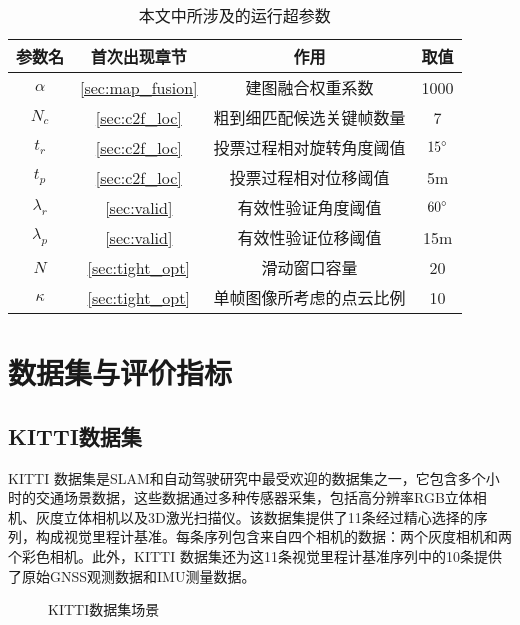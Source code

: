 \begin{table}
\centering
\caption{本文中所涉及的运行超参数}
\begin{tabular}{cccc}
\toprule
参数名 & 首次出现章节 & 作用 & 取值 \\
\midrule
$\alpha$ &  \ref{sec:map_fusion}  & 建图融合权重系数     & 1000 \\
$N_c$ & \ref{sec:c2f_loc}  & 粗到细匹配候选关键帧数量 & 7   \\
$t_r$ &  \ref{sec:c2f_loc}  & 投票过程相对旋转角度阈值 & $15\degree$   \\
$t_p$ &  \ref{sec:c2f_loc}  & 投票过程相对位移阈值   & 5m    \\
$\lambda_r$ &  \ref{sec:valid}  & 有效性验证角度阈值    & $60\degree$   \\
$\lambda_p$ &  \ref{sec:valid}  & 有效性验证位移阈值    & 15m   \\
$N$ &  \ref{sec:tight_opt}  & 滑动窗口容量       & 20   \\
$\kappa$ &  \ref{sec:tight_opt}  & 单帧图像所考虑的点云比例 & 10  \\
\bottomrule
\end{tabular}
\label{tab:hyperparameters}
\end{table}

\section{数据集与评价指标}
\subsection{KITTI数据集}
KITTI 数据集\cite{Geiger2012CVPR}是SLAM和自动驾驶研究中最受欢迎的数据集之一，它包含多个小时的交通场景数据，这些数据通过多种传感器采集，包括高分辨率RGB立体相机、灰度立体相机以及3D激光扫描仪。该数据集提供了11条经过精心选择的序列，构成视觉里程计基准。每条序列包含来自四个相机的数据：两个灰度相机和两个彩色相机。此外，KITTI 数据集还为这11条视觉里程计基准序列中的10条提供了原始GNSS观测数据和IMU测量数据。

\begin{figure}
  \centering
  \caption{KITTI数据集场景}
  \label{fig:kitti_data}
\end{figure}

